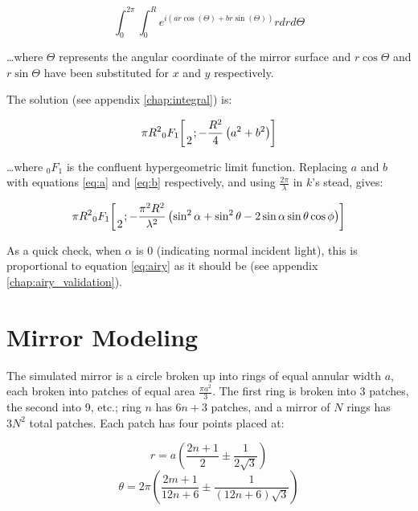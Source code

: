 \documentclass[etd,senior,noacknowledgments]{BYUPhys}
\newcommand*\pFqskip{8mu}
\newcommand*\pFq{\begingroup
        \catcode`\,\active
        \def ,{\mskip\pFqskip\relax}%
        \dopFq
}
\def\dopFq#1#2#3#4#5{%
        {}_{#1}F_{#2}\biggl[\genfrac..{0pt}{}{#3}{#4};#5\biggr]%
        \endgroup
}
\begin{document}
\begin{equation}\label{eq:integral1}
  \int_0^{2\pi}\int_0^R e^{i(ar\cos(\Theta)+br\sin(\Theta))} rdrd\Theta
\end{equation}

\ldots where $\Theta$ represents the angular coordinate of the mirror surface and $r\cos\Theta$ and $r\sin\Theta$ have been substituted for $x$ and $y$ respectively.

The solution (see appendix \ref{chap:integral}) is:

\begin{equation}\label{eq:expected_refl}
  \pi R^2 \pFq{0}{1}{}{2}{-\frac{R^2}{4}\left(a^2+b^2\right)}
\end{equation}

\ldots where ${}_0 F_1$ is the confluent hypergeometric limit function. Replacing $a$ and $b$ with equations \ref{eq:a} and \ref{eq:b} respectively, and using $\frac{2\pi}{\lambda}$ in $k$'s stead, gives:

\begin{equation}
  \pi R^2 \pFq{0}{1}{}{2}{-\frac{\pi^2 R^2}{\lambda^2}\left(\sin^2\alpha+\sin^2\theta-2\sin\alpha\sin\theta\cos\phi\right)}
\end{equation}

As a quick check, when $\alpha$ is 0 (indicating normal incident light), this is proportional to equation \ref{eq:airy} as it should be (see appendix \ref{chap:airy_validation}).







\section{Mirror Modeling} \label{section:mirror_modeling}

The simulated mirror is a circle broken up into rings of equal annular width $a$, each broken into patches of equal area $\frac{\pi a^2}{3}$. The first ring is broken into 3 patches, the second into 9, etc.; ring $n$ has $6n+3$ patches, and a mirror of $N$ rings has $3N^2$ total patches. Each patch has four points placed at:

\begin{equation} \label{eq:point_r}
  r = a \left(\frac{2n+1}{2} \pm \frac{1}{2\sqrt{3}}\right)
\end{equation}
\begin{equation} \label{eq:point_th}
  \theta = 2\pi \left(\frac{2m+1}{12n+6} \pm \frac{1}{\left(12n+6\right)\sqrt{3}}\right)
\end{equation}
\end{document}
